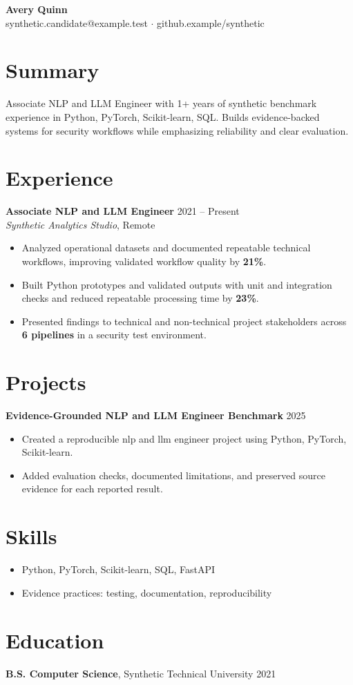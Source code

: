 \documentclass[10pt,letterpaper]{article}
\begin{document}
\begin{center}
{\Large \textbf{Avery Quinn}}\\
synthetic.candidate@example.test $\cdot$ github.example/synthetic
\end{center}

\section*{Summary}
Associate NLP and LLM Engineer with 1+ years of synthetic benchmark experience in Python, PyTorch, Scikit-learn, SQL. Builds evidence-backed systems for security workflows while emphasizing reliability and clear evaluation.

\section*{Experience}
\textbf{Associate NLP and LLM Engineer} \hfill 2021 -- Present\\
\textit{Synthetic Analytics Studio}, Remote
\begin{itemize}
  \item Analyzed operational datasets and documented repeatable technical workflows, improving validated workflow quality by \textbf{21\%}.
  \item Built Python prototypes and validated outputs with unit and integration checks and reduced repeatable processing time by \textbf{23\%}.
  \item Presented findings to technical and non-technical project stakeholders across \textbf{6 pipelines} in a security test environment.
\end{itemize}

\section*{Projects}
\textbf{Evidence-Grounded NLP and LLM Engineer Benchmark} \hfill 2025
\begin{itemize}
  \item Created a reproducible nlp and llm engineer project using Python, PyTorch, Scikit-learn.
  \item Added evaluation checks, documented limitations, and preserved source evidence for each reported result.
\end{itemize}

\section*{Skills}
\begin{itemize}
  \item Python, PyTorch, Scikit-learn, SQL, FastAPI
  \item Evidence practices: testing, documentation, reproducibility
\end{itemize}

\section*{Education}
\textbf{B.S. Computer Science}, Synthetic Technical University \hfill 2021
\end{document}
